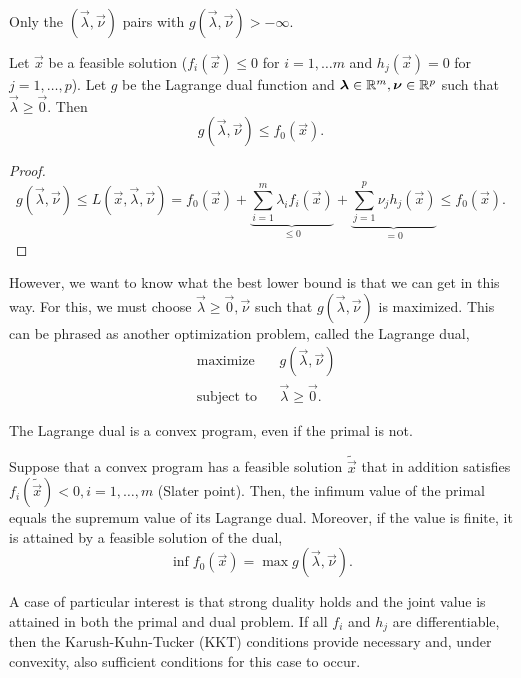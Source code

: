 Only the $(\vec{\lambda},\vec{\nu})$ pairs with $g(\vec{\lambda},\vec{\nu}) > -\infty$.

\begin{lemma}
    Let $\vec{x}$ be a feasible solution ($f_i(\vec{x}) \leq 0$ for $i=1,\ldots m$ and $h_j(\vec{x}) = 0$ for $j=1,\ldots,p$). Let $g$ be the Lagrange dual function and $\bm{\lambda}\in \mathbb{R}^m, \bm{\nu}\in \mathbb{R}^p$ such that $\vec{\lambda} \geq \vec{0}$. Then \[
        g(\vec{\lambda},\vec{\nu}) \leq f_0(\vec{x}).
    \]
\end{lemma}

\begin{proof}
    \[
        g(\vec{\lambda},\vec{\nu}) \leq L(\vec{x},\vec{\lambda},\vec{\nu}) = f_0(\vec{x}) + \underbrace{\sum_{i=1}^{m} \lambda_i f_i(\vec{x})}_{\leq 0} + \underbrace{\sum_{j=1}^{p} \nu_j h_j(\vec{x})}_{=0} \leq f_0(\vec{x}).
    \]
\end{proof}

However, we want to know what the best lower bound is that we can get in this way. For this, we must
choose $\vec{\lambda} \geq \vec{0}, \vec{\nu}$ such that $g(\vec{\lambda},\vec{\nu})$ is maximized.
This can be phrased as another optimization problem, called the Lagrange dual, \[
    \begin{aligned}
    &\text{maximize}   && g(\vec{\lambda},\vec{\nu}) \\
    &\text{subject to} && \vec{\lambda} \geq \vec{0}.
    \end{aligned}
\]

\begin{observation}
    The Lagrange dual is a convex program, even if the primal is not.
\end{observation}

\begin{theorem}
    Suppose that a convex program has a feasible solution $\tilde{\vec{x}}$ that in addition satisfies
    $f_i(\tilde{\vec{x}}) < 0, i = 1,\ldots,m$ (Slater point). Then, the infimum value of the primal
    equals the supremum value of its Lagrange dual. Moreover, if the value is finite, it is attained
    by a feasible solution of the dual, \[
        \inf f_0(\vec{x}) = \max g(\vec{\lambda},\vec{\nu}).
    \]
\end{theorem}

A case of particular interest is that strong duality holds and the joint value is attained in both
the primal and dual problem. If all $f_i$ and $h_j$ are differentiable,
then the Karush-Kuhn-Tucker (KKT) conditions provide necessary and, under convexity, also sufficient
conditions for this case to occur.

